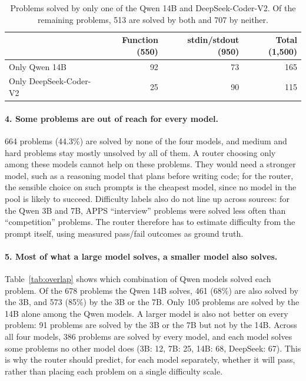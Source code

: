 \begin{table}[!htbp]
\centering
\small
\begin{tabular}{|l|r|r|r|}
\hline
 & \textbf{Function (550)} & \textbf{stdin/stdout (950)} & \textbf{Total (1,500)}\\
\hline
Only Qwen 14B & 92 & 73 & 165\\
Only DeepSeek-Coder-V2 & 25 & 90 & 115\\
\hline
\end{tabular}
\caption{Problems solved by only one of the Qwen 14B and DeepSeek-Coder-V2. Of the remaining problems, 513 are solved by both and 707 by neither.}
\label{tab:h2h}
\end{table}

\paragraph{4. Some problems are out of reach for every model.} 664 problems (44.3\%) are solved by none of the four models, and medium and hard problems stay mostly unsolved by all of them. A router choosing only among these models cannot help on these problems. They would need a stronger model, such as a reasoning model that plans before writing code; for the router, the sensible choice on such prompts is the cheapest model, since no model in the pool is likely to succeed. Difficulty labels also do not line up across sources: for the Qwen 3B and 7B, APPS ``interview'' problems were solved less often than ``competition'' problems. The router therefore has to estimate difficulty from the prompt itself, using measured pass/fail outcomes as ground truth.

\paragraph{5. Most of what a large model solves, a smaller model also solves.} Table~\ref{tab:overlap} shows which combination of Qwen models solved each problem. Of the 678 problems the Qwen 14B solves, 461 (68\%) are also solved by the 3B, and 573 (85\%) by the 3B or the 7B. Only 105 problems are solved by the 14B alone among the Qwen models. A larger model is also not better on every problem: 91 problems are solved by the 3B or the 7B but not by the 14B. Across all four models, 386 problems are solved by every model, and each model solves some problems no other model does (3B: 12, 7B: 25, 14B: 68, DeepSeek: 67). This is why the router should predict, for each model separately, whether it will pass, rather than placing each problem on a single difficulty scale.

